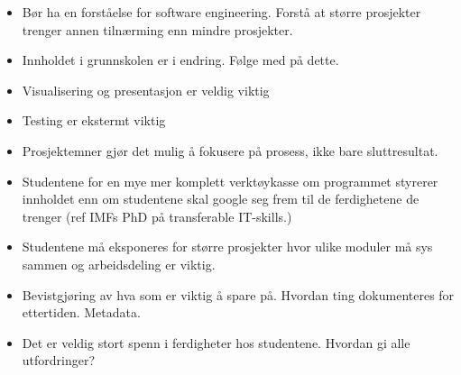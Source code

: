 \begin{itemize}
	\item Bør ha en forståelse for software engineering. Forstå at større prosjekter trenger annen tilnærming enn mindre prosjekter.
	\item Innholdet i grunnskolen er i endring. Følge med på dette.
	\item Visualisering og presentasjon er veldig viktig
	\item Testing er ekstermt viktig
	\item Prosjektemner gjør det mulig å fokusere på prosess, ikke bare sluttresultat.
	\item Studentene for en mye mer komplett verktøykasse om programmet styrerer innholdet enn om studentene skal google seg frem til de ferdighetene de trenger (ref IMFs PhD på transferable IT-skills.)
	\item Studentene må eksponeres for større prosjekter hvor ulike moduler må sys sammen og arbeidsdeling er viktig.
	\item Bevistgjøring av hva som er viktig å spare på. Hvordan ting dokumenteres for ettertiden. Metadata.
	\item Det er veldig stort spenn i ferdigheter hos studentene. Hvordan gi alle utfordringer?
\end{itemize}
